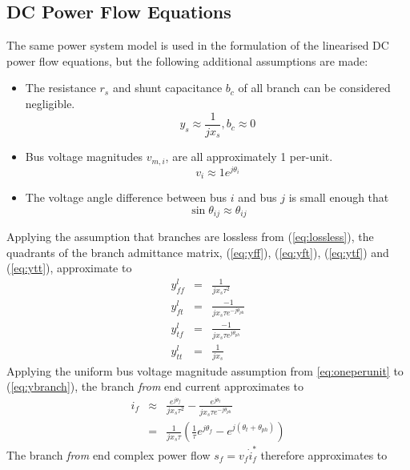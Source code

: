 \subsection{DC Power Flow Equations}
The same power system model is used in the formulation of the linearised DC
power flow equations, but the following additional assumptions are made:
\begin{itemize}
  \item The resistance $r_s$ and shunt capacitance $b_c$ of all branch can be
  considered negligible.
  \begin{equation}
  \label{eq:lossless}
  y_s \approx \frac{1}{jx_s}, b_c \approx 0
  \end{equation}
  \item Bus voltage magnitudes $v_{m,i}$, are all approximately 1 per-unit.
  \begin{equation}
  \label{eq:oneperunit}
  v_i \approx 1e^{j\theta_i}
  \end{equation}
  \item The voltage angle difference between bus $i$ and bus $j$ is small enough
  that
  \begin{equation}
  \label{eq:busangdiff}
  \sin\theta_{ij} \approx \theta_{ij}
  \end{equation}
\end{itemize}
Applying the assumption that branches are lossless from (\ref{eq:lossless}), the
quadrants of the branch admittance matrix, (\ref{eq:yff}), (\ref{eq:yft}),
(\ref{eq:ytf}) and (\ref{eq:ytt}), approximate to
\begin{eqnarray}
y_{ff}^l& =& \frac{1}{jx_s \tau^2}\\
y_{ft}^l& =& \frac{-1}{jx_s \tau e^{-j\theta_{ph}}}\\
y_{tf}^l& =& \frac{-1}{jx_s \tau e^{j\theta_{ph}}}\\
y_{tt}^l& =& \frac{1}{jx_s}
\end{eqnarray}
Applying the uniform bus voltage magnitude assumption from \ref{eq:oneperunit}
to (\ref{eq:ybranch}), the branch \textit{from} end current approximates to
\begin{eqnarray}
i_f& \approx& \frac{e^{j\theta_f}}{jx_s\tau^2} -
\frac{e^{j\theta_t}}{jx_s \tau e^{-j\theta_{ph}}}\\
& =& \frac{1}{jx_s\tau} ( \frac{1}{\tau}e^{j\theta_f} -
e^{j(\theta_t + \theta_{ph})} )
\end{eqnarray}
The branch \textit{from} end complex power flow $s_f = v_f \dot i_f^*$
therefore approximates to
